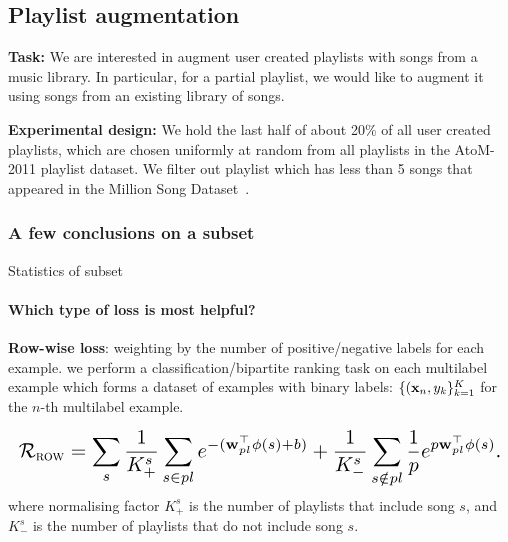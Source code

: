 \subsection{Playlist augmentation}

{\bf Task:}
We are interested in augment user created playlists with songs from a music library.
In particular, for a partial playlist, we would like to augment it using songs from an existing library of songs.

{\bf Experimental design:}
We hold the last half of about 20\% of all user created playlists, 
which are chosen uniformly at random from all playlists in the AtoM-2011 playlist dataset.
We filter out playlist which has less than 5 songs that appeared in the Million Song Dataset~\cite{}.


\newpage

\subsubsection{A few conclusions on a subset}
Statistics of subset \\


\paragraph{Which type of loss is most helpful?}

{\bf Row-wise loss}: weighting by the number of positive/negative labels for each example.
\ie we perform a classification/bipartite ranking task on each multilabel example 
which forms a dataset of examples with binary labels: $\{(\mathbf{x}_n, y_k\}_{k=1}^K$ for the $n$-th multilabel example.

\begin{equation*}
\resizebox{\linewidth}{!}{$
\RCal_\textsc{row} 
= \displaystyle \sum_s 
  \frac{1}{K_+^s} \sum_{s \in pl} e^{-(\w_{pl}^\top \phi(s) + b)} +
  \frac{1}{K_-^s} \sum_{s \notin pl} \frac{1}{p} e^{p \w_{pl}^\top \phi(s)}.
$}
\end{equation*}
where normalising factor $K_+^s$ is the number of playlists that include song $s$,
and $K_-^s$ is the number of playlists that do not include song $s$.


